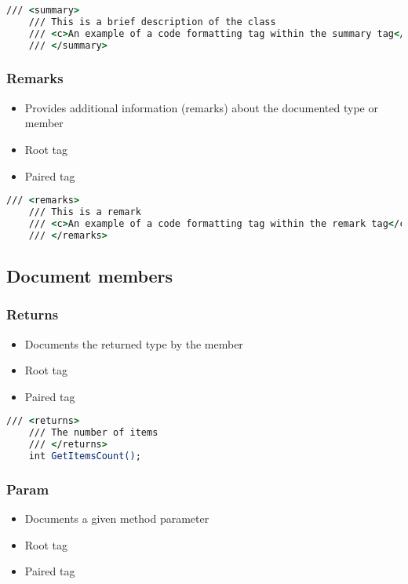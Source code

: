 \begin{lstlisting}[language=csh]
    /// <summary>
    /// This is a brief description of the class
    /// <c>An example of a code formatting tag within the summary tag</c>
    /// </summary>
\end{lstlisting}

\subsubsection*{Remarks}
\begin{itemize}
    \item Provides additional information (remarks) about the documented type or member
    \item Root tag
    \item Paired tag
\end{itemize}

\begin{lstlisting}[language=csh]
    /// <remarks>
    /// This is a remark
    /// <c>An example of a code formatting tag within the remark tag</c>
    /// </remarks>
\end{lstlisting}

\subsection{Document members}

\subsubsection*{Returns}
\begin{itemize}
    \item Documents the returned type by the member
    \item Root tag
    \item Paired tag
\end{itemize}

\begin{lstlisting}[language=csh]
    /// <returns>
    /// The number of items
    /// </returns>
    int GetItemsCount();
\end{lstlisting}

\subsubsection*{Param}
\begin{itemize}
    \item Documents a given method parameter
    \item Root tag
    \item Paired tag
\end{itemize}


